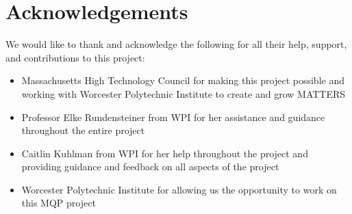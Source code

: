 \chapter*{Acknowledgements}
	
We would like to thank and acknowledge the following for all their help, support, and contributions to this project:
\begin{itemize}
	\item Massachusetts High Technology Council for making this project possible and working with Worcester Polytechnic Institute to create and grow MATTERS
	
	\item Professor Elke Rundensteiner from WPI for her assistance and guidance throughout the entire project
	
	\item Caitlin Kuhlman from WPI for her help throughout the project and providing guidance and feedback on all aspects of the project
	
	\item Worcester Polytechnic Institute for allowing us the opportunity to work on this MQP project 
\end{itemize}